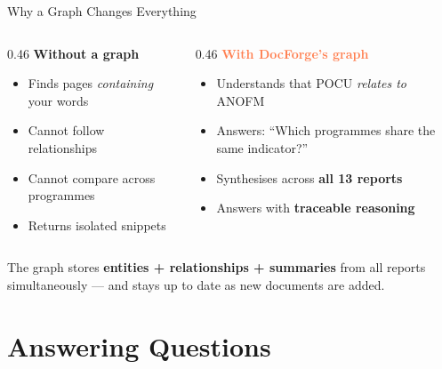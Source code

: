 \documentclass[aspectratio=169,11pt]{beamer}
\begin{document}
\begin{frame}{Why a Graph Changes Everything}
  \vspace{0.2cm}
  \begin{columns}[t]
    \begin{column}{0.46\textwidth}
      \textbf{\textcolor{midgray}{Without a graph}}\\[6pt]
      \begin{itemize}\setlength\itemsep{8pt}
        \item Finds pages \emph{containing} your words
        \item Cannot follow relationships
        \item Cannot compare across programmes
        \item Returns isolated snippets
      \end{itemize}
    \end{column}
    \hfill\vrule\hfill
    \begin{column}{0.46\textwidth}
      \textbf{\textcolor{coral}{With DocForge's graph}}\\[6pt]
      \begin{itemize}\setlength\itemsep{8pt}
        \item Understands that POCU \emph{relates to} ANOFM
        \item Answers: ``Which programmes share the same indicator?''
        \item Synthesises across \textbf{all 13 reports}
        \item Answers with \textbf{traceable reasoning}
      \end{itemize}
    \end{column}
  \end{columns}
  \vspace{0.7cm}
  \begin{center}
    \colorbox{lightcoral!60}{%
      \parbox{0.82\textwidth}{\centering\small
        The graph stores \textbf{entities + relationships + summaries}
        from all reports simultaneously — and stays up to date as
        new documents are added.
      }%
    }
  \end{center}
\end{frame}

\section{Answering Questions}
\end{document}
